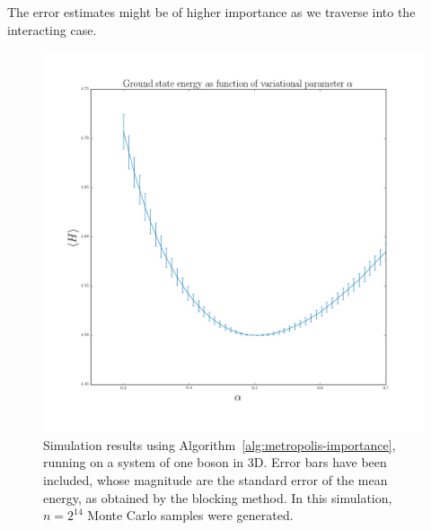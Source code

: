 \documentclass[twocolumn]{article}
\begin{document}
The error estimates might be of higher importance as we traverse into the
interacting case.
\begin{figure}[ht]
    \centering
    \includegraphics[width=0.8\linewidth]{../results/error-plot-3D-2-pow-14.png}
    \caption{Simulation results using Algorithm~\ref{alg:metropolis-importance},
    running on a system of one boson in 3D. Error bars have been included, whose
    magnitude are the standard error of the mean energy, as obtained by the
    blocking method. In this simulation, $n=2^{14}$ Monte Carlo samples were
    generated.}
    \label{fig:errorbar}
\end{figure}


\printbibliography
\end{document}
